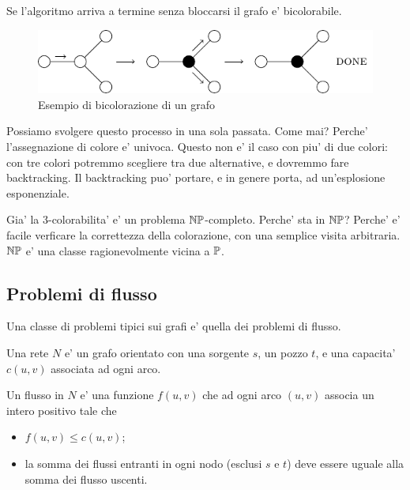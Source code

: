Se l'algoritmo arriva a termine senza bloccarsi il grafo e' bicolorabile.

\begin{figure}[h]
    \begin{center}
        \includegraphics{img/2Coloration.pdf}
    \end{center}
    \caption{Esempio di bicolorazione di un grafo}
\end{figure}

Possiamo svolgere questo processo in una sola passata. Come mai? Perche' l'assegnazione di colore e'
univoca. Questo non e' il caso con piu' di due colori: con tre colori potremmo scegliere tra due
alternative, e dovremmo fare backtracking. Il backtracking puo' portare, e in genere porta, ad
un'esplosione esponenziale.

Gia' la 3-colorabilita' e' un problema $\mathbb{NP}$-completo. Perche' sta in $\mathbb{NP}$? Perche' e'
facile verficare la correttezza della colorazione, con una semplice visita arbitraria. $\mathbb{NP}$ e'
una classe ragionevolmente vicina a $\mathbb{P}$.

\subsection{Problemi di flusso}

Una classe di problemi tipici sui grafi e' quella dei problemi di flusso.

\begin{defn}
    Una rete $N$ e' un grafo orientato con una sorgente $s$, un pozzo $t$, e una capacita' $c(u,v)$
    associata ad ogni arco.
\end{defn}

\begin{defn}
    Un flusso in $N$ e' una funzione $f(u,v)$ che ad ogni arco $(u,v)$ associa un intero positivo
    tale che
    \begin{itemize}
        \item $f(u,v) \leq c(u,v)$;
        \item la somma dei flussi entranti in ogni nodo (esclusi $s$ e $t$) deve essere uguale alla
        somma dei flusso uscenti.
    \end{itemize}
\end{defn}

